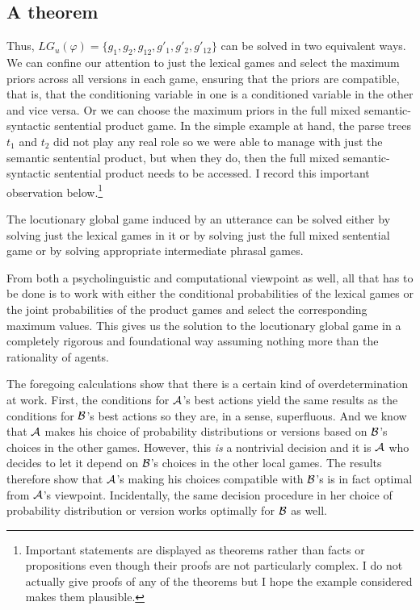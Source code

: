 \subsection{A theorem}

Thus, $LG_u(\varphi) = \{g_1, g_2, g_{12}, g'_1, g'_2, g'_{12}\}$ can be solved in two equivalent ways. We can confine our attention to just the lexical games and select the maximum priors across all versions in each game, ensuring that the priors are compatible, that is, that the conditioning variable in one is a conditioned variable in the other and vice versa. Or we can choose the maximum priors in the full mixed semantic-syntactic sentential product game. In the simple example at hand, the parse trees $t_1$ and $t_2$ did not play any real role so we were able to manage with just the semantic sentential product, but when they do, then the full mixed semantic-syntactic sentential product needs to be accessed. I record this important observation below.\footnote{Important statements are displayed as theorems rather than facts or propositions even though their proofs are not particularly complex. I do not actually give proofs of any of the theorems but I hope the example considered makes them plausible.}

\begin{theorem}

The locutionary global game induced by an utterance can be solved either by solving just the lexical games in it or by solving just the full mixed sentential game or by solving appropriate intermediate phrasal games.
\label{thm:one}
\end{theorem} 

From both a psycholinguistic and computational viewpoint as well, all that has to be done is to work with either the conditional probabilities of the lexical games or the joint probabilities of the product games and select the corresponding maximum values. This gives us the solution to the locutionary global game in a completely rigorous and foundational way assuming nothing more than the rationality of agents.

The foregoing calculations show that there is a certain kind of overdetermination at work. First, the conditions for $\cal A$'s best actions yield the same results as the conditions for $\cal B$'s best actions so they are, in a sense, superfluous. And we know that $\cal A$ makes his choice of probability distributions or versions based on $\cal B$'s choices in the other games. However, this \emph{is} a nontrivial decision and it is $\cal A$ who decides to let it depend on $\cal B$'s choices in the other local games. The results therefore show that $\cal A$'s making his choices compatible with $\cal B$'s is in fact optimal from $\cal A$'s viewpoint. Incidentally, the same decision procedure in her choice of probability distribution or version works optimally for $\cal B$ as well.

